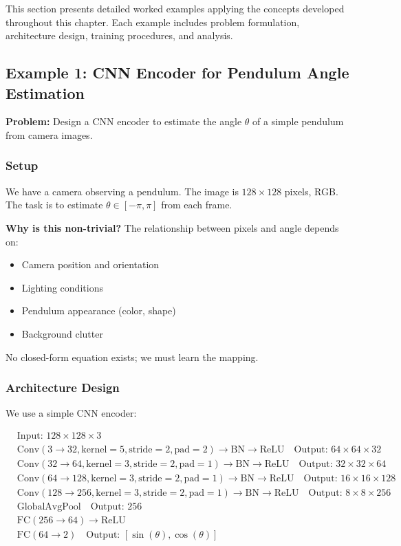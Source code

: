 This section presents detailed worked examples applying the concepts developed throughout this chapter. Each example includes problem formulation, architecture design, training procedures, and analysis.

\subsection{Example 1: CNN Encoder for Pendulum Angle Estimation}

\textbf{Problem:} Design a CNN encoder to estimate the angle $\theta$ of a simple pendulum from camera images.

\subsubsection{Setup}

We have a camera observing a pendulum. The image is $128 \times 128$ pixels, RGB. The task is to estimate $\theta \in [-\pi, \pi]$ from each frame.

\textbf{Why is this non-trivial?} The relationship between pixels and angle depends on:
\begin{itemize}
    \item Camera position and orientation
    \item Lighting conditions
    \item Pendulum appearance (color, shape)
    \item Background clutter
\end{itemize}

No closed-form equation exists; we must learn the mapping.

\subsubsection{Architecture Design}

We use a simple CNN encoder:

\begin{align}
&\text{Input: } 128 \times 128 \times 3 \\
&\text{Conv}(3 \rightarrow 32, \text{kernel}=5, \text{stride}=2, \text{pad}=2) \rightarrow \text{BN} \rightarrow \text{ReLU} \quad \text{Output: } 64 \times 64 \times 32 \\
&\text{Conv}(32 \rightarrow 64, \text{kernel}=3, \text{stride}=2, \text{pad}=1) \rightarrow \text{BN} \rightarrow \text{ReLU} \quad \text{Output: } 32 \times 32 \times 64 \\
&\text{Conv}(64 \rightarrow 128, \text{kernel}=3, \text{stride}=2, \text{pad}=1) \rightarrow \text{BN} \rightarrow \text{ReLU} \quad \text{Output: } 16 \times 16 \times 128 \\
&\text{Conv}(128 \rightarrow 256, \text{kernel}=3, \text{stride}=2, \text{pad}=1) \rightarrow \text{BN} \rightarrow \text{ReLU} \quad \text{Output: } 8 \times 8 \times 256 \\
&\text{GlobalAvgPool} \quad \text{Output: } 256 \\
&\text{FC}(256 \rightarrow 64) \rightarrow \text{ReLU} \\
&\text{FC}(64 \rightarrow 2) \quad \text{Output: } [\sin(\theta), \cos(\theta)]
\end{align}

